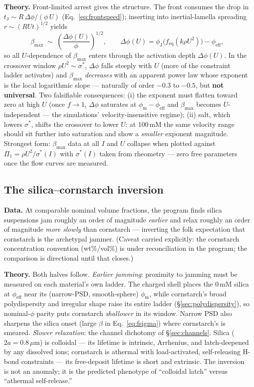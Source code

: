 \documentclass[11pt]{article}
\newcommand{\phiJ}{\phi_{\mathrm{J}}}
\newcommand{\phiM}{\phi_{\mathrm{m}}}
\newcommand{\sigmastar}{\sigma^{*}}
\begin{document}
\textbf{Theory.} Front-limited arrest gives the structure. The front consumes the drop in $t_{\mathrm{J}} \sim R\,\Delta\phi/(\phi\,U)$ (Eq.~\eqref{eq:frontspeed}); inserting into inertial-lamella spreading $r \sim (RUt)^{1/2}$ yields
\begin{equation}
\beta_{\max} \;\sim\; \left(\frac{\Delta\phi(U)}{\phi}\right)^{1/2},
\qquad
\Delta\phi(U) = \phiJ\!\big(f_{\mathrm{eq}}(k\rho U^{2})\big) - \phi_{\mathrm{eff}},
\label{eq:betamax}
\end{equation}
so all $U$-dependence of $\beta_{\max}$ enters through the activation depth $\Delta\phi(U)$. In the crossover window $\rho U^{2} \sim \sigmastar$, $\Delta\phi$ falls steeply with $U$ (more of the constraint ladder activates) and $\beta_{\max}$ \emph{decreases} with an apparent power law whose exponent is the local logarithmic slope --- naturally of order $-0.3$ to $-0.5$, but \textbf{not universal}. Two falsifiable consequences: (i) the exponent must flatten toward zero at high $U$ (once $f\to1$, $\Delta\phi$ saturates at $\phiM-\phi_{\mathrm{eff}}$ and $\beta_{\max}$ becomes $U$-independent --- the simulations' velocity-insensitive regime); (ii) salt, which lowers $\sigmastar$, shifts the crossover to lower $U$: at 100\,mM the same velocity range should sit further into saturation and show a \emph{smaller} exponent magnitude. Strongest form: $\beta_{\max}$ data at all $I$ and $U$ collapse when plotted against $\Pi_{1} = \rho U^{2}/\sigmastar(I)$ with $\sigmastar(I)$ taken from rheometry --- zero free parameters once the flow curves are measured.

\subsection{The silica--cornstarch inversion}
\textbf{Data.} At comparable nominal volume fractions, the program finds silica suspensions jam roughly an order of magnitude \emph{earlier} and relax roughly an order of magnitude \emph{more slowly} than cornstarch --- inverting the folk expectation that cornstarch is the archetypal jammer. (Caveat carried explicitly: the cornstarch concentration convention (wt\%/vol\%) is under reconciliation in the program; the comparison is directional until that closes.)

\textbf{Theory.} Both halves follow. \emph{Earlier jamming}: proximity to jamming must be measured on each material's own ladder. The charged shell places the 0\,mM silica at $\phi_{\mathrm{eff}}$ near its (narrow-PSD, smooth-sphere) $\phiM$, while cornstarch's broad polydispersity and irregular shape raise its entire ladder (\S\ref{sec:polydispersity}), so nominal-$\phi$ parity puts cornstarch \emph{shallower} in its window. Narrow PSD also sharpens the silica onset (large $\beta$ in Eq.~\eqref{eq:fsigma}) where cornstarch's is smeared. \emph{Slower relaxation}: the channel dichotomy of \S\ref{sec:channels}. Silica ($2a = 0.8\,\mu$m) is colloidal --- its lifetime is intrinsic, Arrhenius, and latch-deepened by any dissolved ions; cornstarch is athermal with load-activated, self-releasing H-bond constraints --- its free-deposit lifetime is short and extrinsic. The inversion is not an anomaly; it is the predicted phenotype of ``colloidal latch'' versus ``athermal self-release.''
\end{document}
